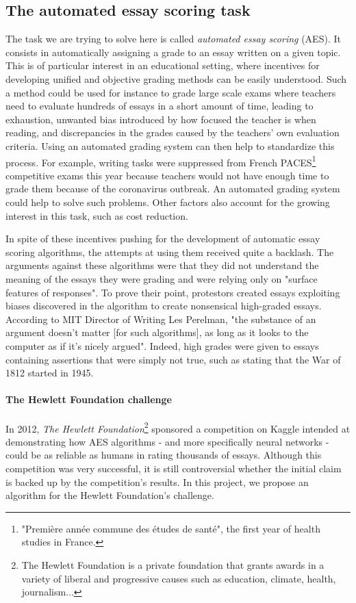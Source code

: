 \documentclass[a4paper,12pt,english]{article}
\begin{document}
\subsection{The automated essay scoring task}
The task we are trying to solve here is called \emph{automated essay scoring} (AES). It consists in automatically assigning a grade to an essay written on a given topic. This is of particular interest in an educational setting, where incentives for developing unified and objective grading methods can be easily understood. Such a method could be used for instance to grade large scale exams where teachers need to evaluate hundreds of essays in a short amount of time, leading to exhaustion, unwanted bias introduced by how focused the teacher is when reading, and discrepancies in the grades caused by the teachers' own evaluation criteria. Using an automated grading system can then help to standardize this process. For example, writing tasks were suppressed from French PACES\footnote{"Première année commune des études de santé", the first year of health studies in France.} competitive exams this year because teachers would not have enough time to grade them because of the coronavirus outbreak\cite{paces}. An automated grading system could help to solve such problems. Other factors also account for the growing interest in this task, such as cost reduction.\par
In spite of these incentives pushing for the development of automatic essay scoring algorithms, the attempts at using them received quite a backlash. The arguments against these algorithms were that they did not understand the meaning of the essays they were grading and were relying only on "surface features of responses". To prove their point, protestors created essays exploiting biases discovered in the algorithm to create nonsensical high-graded essays. According to MIT Director of Writing Les Perelman, "the substance of an argument doesn’t matter [for such algorithms], as long as it looks to the computer as if it’s nicely argued"\cite{nyt2012}. Indeed, high grades were given to essays containing assertions that were simply not true, such as stating that the War of 1812 started in 1945.
\paragraph{The Hewlett Foundation challenge} In 2012, \emph{The Hewlett Foundation}\footnote{The Hewlett Foundation is a private foundation that grants awards in a variety of liberal and progressive causes such as education, climate, health, journalism...} sponsored a competition on Kaggle\cite{kaggle} intended at demonstrating how AES algorithms - and more specifically neural networks - could be as reliable as humans in rating thousands of essays. Although this competition was very successful\cite{nguyen2018neural,song2013automated,turanga,chanakya}, it is still controversial whether the initial claim is backed up by the competition's results. In this project, we propose an algorithm for the Hewlett Foundation's challenge.
\end{document}
